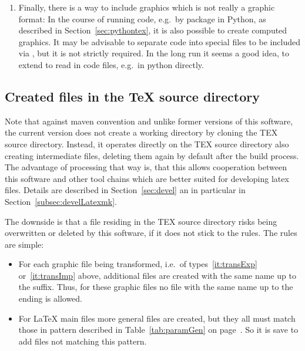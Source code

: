 \begin{enumerate}
those graphics files induce additional files 
by running \LaTeX.
Essentially, each of the abovementioned type of format
can be included that way but currently,
this is done for the \gls{svg}-format only
included by the package  (see~\cite{SvgP}).
The author personally refrains from using packages like that
because of the lack of flexibility and further drawbacks. 
\item 
Finally, there is a way to include graphics which is not really a graphic format: 
In the course of running code, e.g.~by package  in Python, 
as described in Section~\ref{sec:pythontex}, 
it is also possible to create computed graphics. 
It may be advisable to separate code into special files to be included via , 
but it is not strictly required. 
In the long run it seems a good idea, to extend  
to read in code files, e.g.~in python directly. 
\end{enumerate}




\subsection{Created files in the \TeX{} source directory}\label{subsec:sourceCreated}

Note that against maven convention and unlike former versions of this software, 
the current version does not create a working directory 
by cloning the TEX source directory. 
Instead, it operates directly on the TEX source directory 
also creating intermediate files, 
deleting them again by default after the build process.
The advantage of processing that way is,
that this allows cooperation between this software
and other tool chains which are better suited for developing latex files.
Details are described in Section~\ref{sec:devel} an in particular in Section~\ref{subsec:develLatexmk}.

The downside is that a file residing in the TEX source directory 
risks being overwritten or deleted by this software, 
if it does not stick to the rules. 
The rules are simple: 
%
\begin{itemize}
\item
For each graphic file being transformed, 
i.e.~of types~\ref{it:transExp} or~\ref{it:transImp} above, 
additional files are created with the same name up to the suffix. 
Thus, for these graphic files no file with the same name 
up to the ending is allowed. 
\item
For \LaTeX{} main files more general files are created, 
but they all must match those in pattern  
described in Table~\ref{tab:paramGen} on page~\pageref{tab:paramGen}. 
So it is save to add files not matching this pattern. 
\end{itemize}


